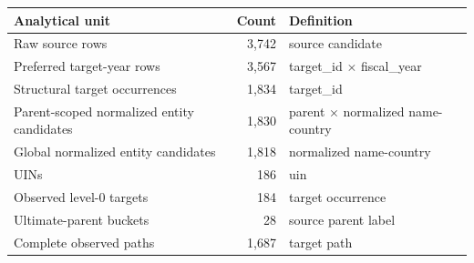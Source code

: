 \begin{tabular}{lrl}
\toprule
Analytical unit & Count & Definition \\
\midrule
Raw source rows & 3,742 & source candidate \\
Preferred target-year rows & 3,567 & target\_id $\times$ fiscal\_year \\
Structural target occurrences & 1,834 & target\_id \\
Parent-scoped normalized entity candidates & 1,830 & parent $\times$ normalized name-country \\
Global normalized entity candidates & 1,818 & normalized name-country \\
UINs & 186 & uin \\
Observed level-0 targets & 184 & target occurrence \\
Ultimate-parent buckets & 28 & source parent label \\
Complete observed paths & 1,687 & target path \\
\bottomrule
\end{tabular}
